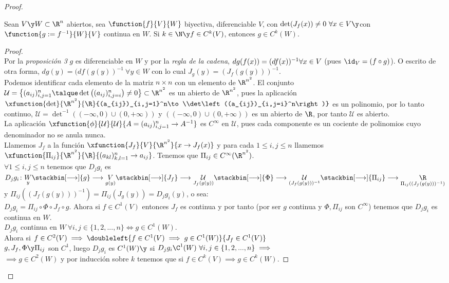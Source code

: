 \begin{proof}
	\begin{proposicioni} Sean $V\y W\subset\R^n$ abiertos, sea $\function{f}{V}{W}$ biyectiva, diferenciable $V$, con $\det(J_f(x))\neq0\ \forall x\in V\y$con\\
	$\function{g:=f^{-1}}{W}{V}$ continua en $W$. Si $k\in \N\y f\in C^k(V)$, entonces $g\in C^k(W)$.
	\end{proposicioni}
	\begin{proof}\ \\
	Por la \textit{proposición 3} $g$ es diferenciable en $W$ y por la \textit{regla de la cadena}, $dg(f(x))=(df(x))^{-1}\\
	\forall x\in V$ (pues $\id_V=(f\circ g)$). O escrito de otra forma, $dg(y)=(df(g(y))^{-1}\ \forall y\in W$ con lo cual $J_g(y)=(J_f(g(y)))^{-1}$.\\
	Podemos identificar cada elemento de la matriz $n\times n$ con un elemento de $\R^{n^2}$. El conjunto $\mathcal{U}=\left\{(a_{ij})_{i,j=1}^n\talque \det\left((a_{ij})_{i,j=i}^n\right)\neq0\right\}\subset\R^{n^2}$ es un abierto de $\R^{n^2}$, pues la aplicación $\xfunction{\det}{\R^{n^2}}{\R}{(a_{ij})_{i,j=1}^n\to\\det\left((a_{ij})_{i,j=i}^n\right)}$ es un polinomio, por lo tanto continuo, $\mathcal{U}=\det^{-1}((-\infty,0)\cup(0,+\infty))$ y $((-\infty,0)\cup(0,+\infty))$ es un abierto de $\R$, por tanto $\mathcal{U}$ es abierto.\\
	La aplicación $\xfunction{\phi}{\mathcal{U}}{\mathcal{U}}{A=(a_{ij})^n_{i,j=1}\to A^{-1}}$ es $C^\infty$ en $\mathcal{U}$, pues cada componente es un cociente de polinomios cuyo denominador no se anula nunca.\\
	Llamemos $J_f$ a la función $\xfunction{J_f}{V}{\R^{n^2}}{x\to J_f(x)}$ y para cada $1\leq i,j\leq n$ llamemos $\xfunction{\Pi_{ij}}{\R^{n^2}}{\R}{(a_{kl})_{k,l=1}^n\to a_{ij}}$. Tenemos que $\Pi_{ij}\in C^\infty(\R^{n^2})$.\\
	$\forall 1\leq i,j\leq n$ tenemos que $D_jg_i$ es $D_jg_i\colon\underset{y}W\stackbin[\longrightarrow]{g}\longrightarrow\underset{g(y)}V\stackbin[\longrightarrow]{J_f}\longrightarrow\underset{J_f(g(y))}{\mathcal{U}}\stackbin[\longrightarrow]{\Phi}\longrightarrow\underset{(J_f(g(y)))^{-1}}{\mathcal{U}}\stackbin[\longrightarrow]{\Pi_{ij}}\longrightarrow\underset{\Pi_{ij}((J_f(g(y)))^{-1})}\R$ y $\Pi_{ij}\left((J_f(g(y)))^{-1}\right)=\Pi_{ij}(J_g(y))=D_jg_i(y)$, o sea:\\
	$D_jg_i=\Pi_{ij}\circ\Phi\circ J_f\circ g$. Ahora si $f\in C^1(V)$ entonces $J_f$ es continua  y por tanto (por ser $g$ continua y $\Phi,\Pi_{ij}$ son $C^\infty$) tenemos que $D_jg_i$ es continua en $W$.\\
	$D_jg_i$ continua en $W\ \forall i,j\in\{1,2,...,n\}\iff g\in C^1(W)$.\\
	Ahora si $f\in C^2(V)\implies \doubleleft{f\in C^1(V)\implies g\in C^1(W)}{J_f\in C^1(V)}$\\
	$g,J_f,\Phi\y\Pi_{ij}$ son $C^1$, luego $D_jg_i$ es $C^1(W)\y $ si $D_jg_i\C^1(W)\ \forall i,j\in\{1,2,...,n\}\implies$\\
	$\implies g\in C^2(W)$ y por inducción sobre $k$ tenemos que si $f\in C^k(V)\implies g\in C^k(W)$.
	\end{proof}
	

\end{proof}
